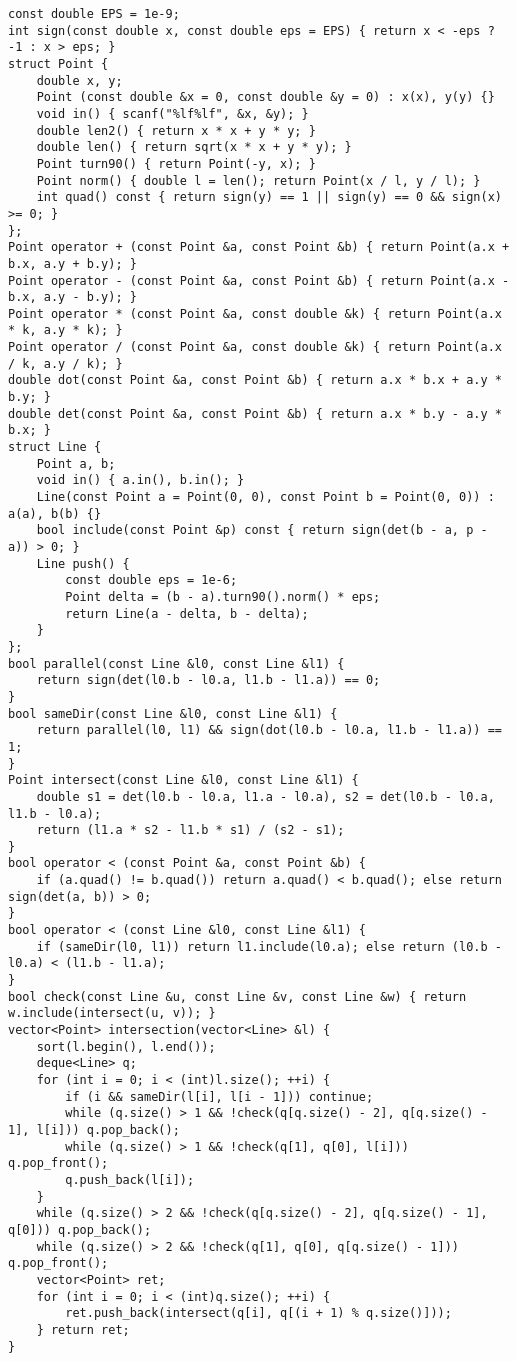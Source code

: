 \begin{lstlisting}
const double EPS = 1e-9;
int sign(const double x, const double eps = EPS) { return x < -eps ? -1 : x > eps; }
struct Point {
	double x, y;
	Point (const double &x = 0, const double &y = 0) : x(x), y(y) {}
	void in() { scanf("%lf%lf", &x, &y); }
	double len2() { return x * x + y * y; }
	double len() { return sqrt(x * x + y * y); }
	Point turn90() { return Point(-y, x); }
	Point norm() { double l = len(); return Point(x / l, y / l); }
	int quad() const { return sign(y) == 1 || sign(y) == 0 && sign(x) >= 0; } 
};
Point operator + (const Point &a, const Point &b) { return Point(a.x + b.x, a.y + b.y); }
Point operator - (const Point &a, const Point &b) { return Point(a.x - b.x, a.y - b.y); }
Point operator * (const Point &a, const double &k) { return Point(a.x * k, a.y * k); }
Point operator / (const Point &a, const double &k) { return Point(a.x / k, a.y / k); }
double dot(const Point &a, const Point &b) { return a.x * b.x + a.y * b.y; }
double det(const Point &a, const Point &b) { return a.x * b.y - a.y * b.x; }
struct Line {
	Point a, b;
	void in() { a.in(), b.in(); }
	Line(const Point a = Point(0, 0), const Point b = Point(0, 0)) : a(a), b(b) {}
	bool include(const Point &p) const { return sign(det(b - a, p - a)) > 0; }
	Line push() {
		const double eps = 1e-6;
		Point delta = (b - a).turn90().norm() * eps;
		return Line(a - delta, b - delta);
	}
}; 
bool parallel(const Line &l0, const Line &l1) {
	return sign(det(l0.b - l0.a, l1.b - l1.a)) == 0;
}
bool sameDir(const Line &l0, const Line &l1) {
	return parallel(l0, l1) && sign(dot(l0.b - l0.a, l1.b - l1.a)) == 1;
}
Point intersect(const Line &l0, const Line &l1) {
	double s1 = det(l0.b - l0.a, l1.a - l0.a), s2 = det(l0.b - l0.a, l1.b - l0.a);
	return (l1.a * s2 - l1.b * s1) / (s2 - s1);
}
bool operator < (const Point &a, const Point &b) {
	if (a.quad() != b.quad()) return a.quad() < b.quad(); else return sign(det(a, b)) > 0;
}
bool operator < (const Line &l0, const Line &l1) {
	if (sameDir(l0, l1)) return l1.include(l0.a); else return (l0.b - l0.a) < (l1.b - l1.a);
}
bool check(const Line &u, const Line &v, const Line &w) { return w.include(intersect(u, v)); }
vector<Point> intersection(vector<Line> &l) {
	sort(l.begin(), l.end());
	deque<Line> q;
	for (int i = 0; i < (int)l.size(); ++i) {
		if (i && sameDir(l[i], l[i - 1])) continue;
		while (q.size() > 1 && !check(q[q.size() - 2], q[q.size() - 1], l[i])) q.pop_back();
		while (q.size() > 1 && !check(q[1], q[0], l[i])) q.pop_front();
		q.push_back(l[i]);
	} 
	while (q.size() > 2 && !check(q[q.size() - 2], q[q.size() - 1], q[0])) q.pop_back();
	while (q.size() > 2 && !check(q[1], q[0], q[q.size() - 1])) q.pop_front();
	vector<Point> ret;
	for (int i = 0; i < (int)q.size(); ++i) {
		ret.push_back(intersect(q[i], q[(i + 1) % q.size()]));
	} return ret;
}
\end{lstlisting}